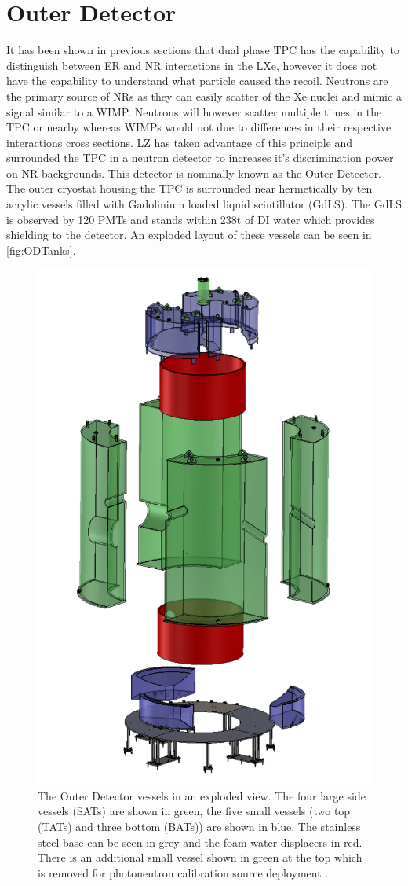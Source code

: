 \section{Outer Detector}
It has been shown in previous sections that dual phase TPC has the capability to distinguish between ER and NR interactions in the LXe, however it does not have the capability to understand what particle caused the recoil. Neutrons are the primary source of NRs as they can easily scatter of the Xe nuclei and mimic a signal similar to a WIMP. Neutrons will however scatter multiple times in the TPC or nearby whereas WIMPs would not due to differences in their respective interactions cross sections. LZ has taken advantage of this principle and surrounded the TPC in a neutron detector to increases it's discrimination power on NR backgrounds. This detector is nominally known as the Outer Detector.
The outer cryostat housing the TPC is surrounded near hermetically by ten acrylic vessels filled with  Gadolinium loaded liquid scintillator (GdLS). The GdLS is observed by 120 PMTs and stands within 238t of DI water which provides shielding to the detector. An exploded layout of these vessels can be seen in \autoref{fig:ODTanks}.
\begin{figure}
    \centering
    \includegraphics[width=0.5\linewidth]{figures/LZ/CAD_ODTanks.jpg}
    \caption{The Outer Detector vessels in an exploded view. The four large side vessels (SATs) are shown in green, the five small vessels (two top (TATs) and three bottom (BATs)) are shown in blue. The stainless steel base can be seen in grey and the foam water displacers in red. There is an additional small vessel shown in green at the top which is removed for photoneutron calibration source deployment \cite{LZNIMA}.}
    \label{fig:ODTanks}
\end{figure}

